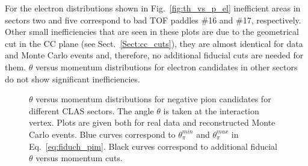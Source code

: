 For the electron distributions shown in Fig.~\ref{fig:th_vs_p_el} inefficient areas in sectors two and five correspond to bad TOF paddles \#16 and \#17, respectively. Other small inefficiencies that are seen in these plots are due to the geometrical cut in the CC plane (see Sect.~\ref{Sect:cc_cuts}), they are almost identical for data and Monte Carlo events and, therefore, no additional fiducial cuts are needed for them.  $\theta$ versus momentum distributions for electron candidates in other sectors do not show significant inefficiencies. 


\begin{figure}[htp]
\begin{center}
\caption{\small $\theta$ versus momentum distributions for negative pion candidates for different CLAS sectors. The angle $\theta$ is taken at the interaction vertex. Plots are given both for real data and reconstructed Monte Carlo events. Blue curves correspond to $\theta_{\pi}^{min}$ and $\theta_{\pi}^{max}$ in Eq.~\eqref{eq:fiduch_pim}. Black curves correspond to additional fiducial $\theta$ versus momentum cuts. \label{fig:th_vs_p_pim}}
\end{center}
\end{figure}

